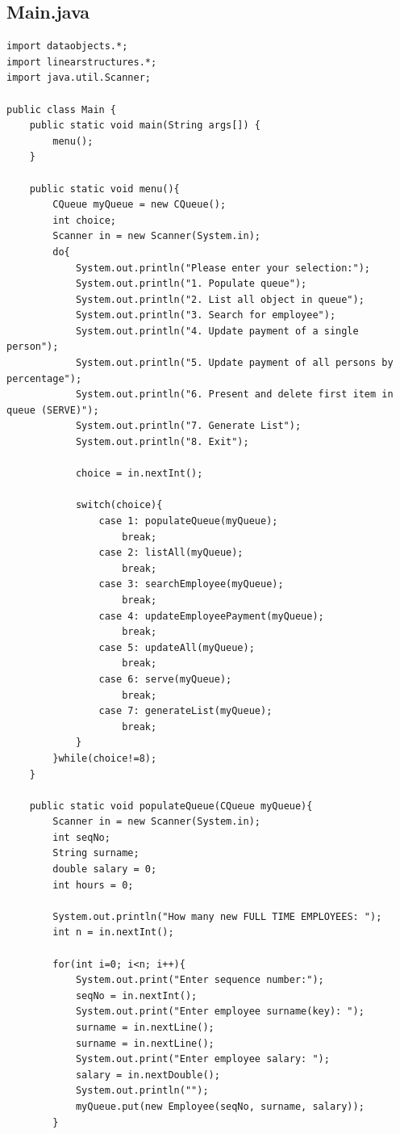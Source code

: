 \documentclass[12pt]{article}
\begin{document}
\subsection{Main.java}
\begin{lstlisting}
import dataobjects.*;
import linearstructures.*;
import java.util.Scanner;

public class Main {
    public static void main(String args[]) {        
        menu();
    }

    public static void menu(){
        CQueue myQueue = new CQueue();
        int choice;
        Scanner in = new Scanner(System.in);
        do{
            System.out.println("Please enter your selection:");
            System.out.println("1. Populate queue");            
            System.out.println("2. List all object in queue");
            System.out.println("3. Search for employee");
            System.out.println("4. Update payment of a single person");
            System.out.println("5. Update payment of all persons by percentage");
            System.out.println("6. Present and delete first item in queue (SERVE)");
            System.out.println("7. Generate List");
            System.out.println("8. Exit");

            choice = in.nextInt();

            switch(choice){
                case 1: populateQueue(myQueue);
                    break;
                case 2: listAll(myQueue);
                    break;   
                case 3: searchEmployee(myQueue);
                    break; 
                case 4: updateEmployeePayment(myQueue);
                    break;
                case 5: updateAll(myQueue);
                    break; 
                case 6: serve(myQueue);
                    break;   
                case 7: generateList(myQueue);
                    break;            
            }
        }while(choice!=8);
    }

    public static void populateQueue(CQueue myQueue){
        Scanner in = new Scanner(System.in);
        int seqNo;
        String surname;
        double salary = 0;
        int hours = 0;

        System.out.println("How many new FULL TIME EMPLOYEES: ");
        int n = in.nextInt();
        
        for(int i=0; i<n; i++){
            System.out.print("Enter sequence number:");
            seqNo = in.nextInt();
            System.out.print("Enter employee surname(key): ");
            surname = in.nextLine();
            surname = in.nextLine();
            System.out.print("Enter employee salary: ");
            salary = in.nextDouble();
            System.out.println("");
            myQueue.put(new Employee(seqNo, surname, salary));
        }


\end{lstlisting}
\end{document}
